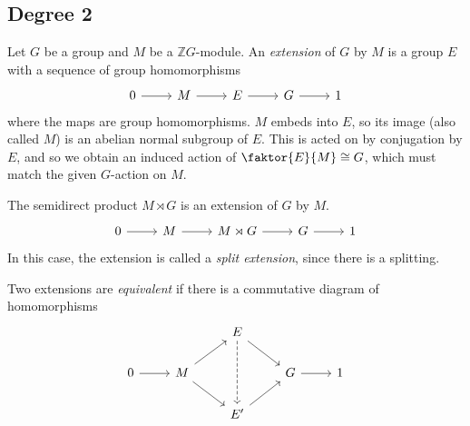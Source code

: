 \subsection{Degree 2}
\begin{definition}
    Let \( G \) be a group and \( M \) be a \( \mathbb Z G \)-module.
    An \emph{extension} of \( G \) by \( M \) is a group \( E \) with a sequence of group homomorphisms
\[\begin{tikzcd}
	0 & M & E & G & 1
	\arrow[from=1-1, to=1-2]
	\arrow[from=1-2, to=1-3]
	\arrow[from=1-3, to=1-4]
	\arrow[from=1-4, to=1-5]
\end{tikzcd}\]
    where the maps are group homomorphisms.
    \( M \) embeds into \( E \), so its image (also called \( M \)) is an abelian normal subgroup of \( E \).
    This is acted on by conjugation by \( E \), and so we obtain an induced action of \( \faktor{E}{M} \cong G \), which must match the given \( G \)-action on \( M \).
\end{definition}
\begin{example}
    The semidirect product \( M \rtimes G \) is an extension of \( G \) by \( M \).
\[\begin{tikzcd}
	0 & M & {M \rtimes G} & G & 1
	\arrow[from=1-1, to=1-2]
	\arrow[from=1-2, to=1-3]
	\arrow[from=1-3, to=1-4]
	\arrow[from=1-4, to=1-5]
\end{tikzcd}\]
    In this case, the extension is called a \emph{split extension}, since there is a splitting.
\end{example}
\begin{definition}
    Two extensions are \emph{equivalent} if there is a commutative diagram of homomorphisms
\[\begin{tikzcd}
	&& E \\
	0 & M && G & 1 \\
	&& {E'}
	\arrow[from=2-1, to=2-2]
	\arrow[from=2-2, to=1-3]
	\arrow[from=1-3, to=2-4]
	\arrow[from=2-4, to=2-5]
	\arrow[dashed, from=1-3, to=3-3]
	\arrow[from=3-3, to=2-4]
	\arrow[from=2-2, to=3-3]
\end{tikzcd}\]
\end{definition}

